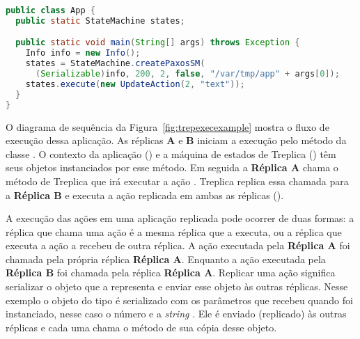 \begin{lstlisting}[language=Java, caption={Exemplo de classe que prepara o Treplica e executa uma ação}, label={cod:TreplicaMainAp}]
public class App {
  public static StateMachine states;

  public static void main(String[] args) throws Exception {
    Info info = new Info();
    states = StateMachine.createPaxosSM( 
      (Serializable)info, 200, 2, false, "/var/tmp/app" + args[0]);
    states.execute(new UpdateAction(2, "text"));
  }
}
\end{lstlisting}

O diagrama de sequência da Figura~\ref{fig:trepexecexample} mostra o fluxo de execução dessa aplicação. As réplicas \textbf{A} e \textbf{B} iniciam a execução pelo método  da classe . O contexto da aplicação () e a máquina de estados de Treplica () têm seus objetos instanciados por esse método. Em seguida a \textbf{Réplica A} chama o método  de Treplica que irá executar a ação . Treplica replica essa chamada para a \textbf{Réplica B} e executa a ação replicada em ambas as réplicas ().

A execução das ações em uma aplicação replicada pode ocorrer de duas formas: a réplica que chama uma ação é a mesma réplica que a executa, ou a réplica que executa a ação a recebeu de outra réplica. A ação executada pela \textbf{Réplica A} foi chamada pela própria réplica \textbf{Réplica A}. Enquanto a ação executada pela \textbf{Réplica B} foi chamada pela réplica \textbf{Réplica A}. Replicar uma ação significa serializar o objeto que a representa e enviar esse objeto às outras réplicas. Nesse exemplo o objeto do tipo  é serializado com os parâmetros que recebeu quando foi instanciado, nesse caso o número  e a \textit{string} . Ele é enviado (replicado) às outras réplicas e cada uma chama o método  de sua cópia desse objeto. 

